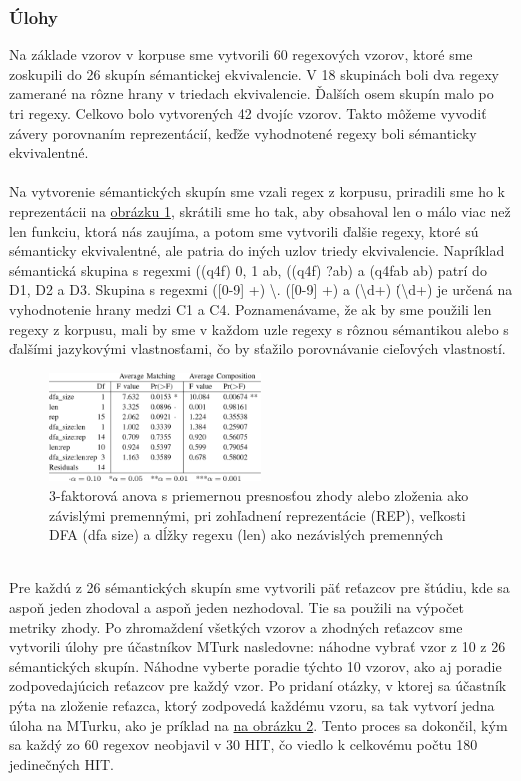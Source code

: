 \documentclass[10pt,twoside,slovak,a4paper]{article}
\begin{document}
\subsubsection{Úlohy}
Na základe vzorov v korpuse sme vytvorili 60 regexových vzorov, ktoré sme zoskupili do 26 skupín sémantickej ekvivalencie. V 18 skupinách boli dva regexy zamerané na rôzne hrany v triedach ekvivalencie. Ďalších osem skupín malo po tri regexy. Celkovo bolo vytvorených 42 dvojíc vzorov. Takto môžeme vyvodiť závery porovnaním reprezentácií, keďže vyhodnotené regexy boli sémanticky ekvivalentné.\cite{Chapman2017} \\\\
Na vytvorenie sémantických skupín sme vzali regex z korpusu, priradili sme ho k reprezentácii na \hyperref[fig:obrazok1]{obrázku 1}, skrátili sme ho tak, aby obsahoval len o málo viac než len funkciu, ktorá nás zaujíma, a potom sme vytvorili ďalšie regexy, ktoré sú sémanticky ekvivalentné, ale patria do iných uzlov triedy ekvivalencie. Napríklad sémantická skupina s regexmi ((q4f) {0, 1} ab, ((q4f) ?ab) a (q4fab \textbar ab) patrí do D1, D2 a D3. Skupina s regexmi ([0-9] +) \textbackslash . ([0-9] +) a (\textbackslash d+) \. (\textbackslash d+) je určená na vyhodnotenie hrany medzi C1 a C4. Poznamenávame, že ak by sme použili len regexy z korpusu, mali by sme v každom uzle regexy s rôznou sémantikou alebo s ďalšími jazykovými vlastnosťami, čo by sťažilo porovnávanie cieľových vlastností.\cite{Chapman2017}
\begin{figure}[h]
	\centering
	\includegraphics[width=0.5\textwidth]{table2.png}
	\caption{3-faktorová anova s priemernou presnosťou zhody alebo zloženia ako závislými premennými, pri zohľadnení reprezentácie (REP), veľkosti DFA (dfa \textunderscore size) a dĺžky regexu (len) ako nezávislých premenných \cite{Chapman2017}}
	\label{fig:table2}
  \end{figure} \\
Pre každú z 26 sémantických skupín sme vytvorili päť reťazcov pre štúdiu, kde sa aspoň jeden zhodoval a aspoň jeden nezhodoval. Tie sa použili na výpočet metriky zhody. Po zhromaždení všetkých vzorov a zhodných reťazcov sme vytvorili úlohy pre účastníkov MTurk nasledovne: náhodne vybrať vzor z 10 z 26 sémantických skupín. Náhodne vyberte poradie týchto 10 vzorov, ako aj poradie zodpovedajúcich reťazcov pre každý vzor. Po pridaní otázky, v ktorej sa účastník pýta na zloženie reťazca, ktorý zodpovedá každému vzoru, sa tak vytvorí jedna úloha na MTurku, ako je príklad na \hyperref[fig:obrazok2]{na obrázku 2}. Tento proces sa dokončil, kým sa každý zo 60 regexov neobjavil v 30 HIT, čo viedlo k celkovému počtu 180 jedinečných HIT.\cite{Chapman2017}
\end{document}
